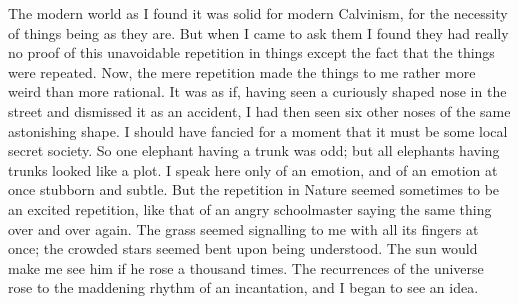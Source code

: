 \documentclass{book}
\begin{document}
The modern world as I found it was solid for modern Calvinism, for the necessity of things being as they are. But when I came to ask them I found they had really no proof of this unavoidable repetition in things except the fact that the things were repeated. Now, the mere repetition made the things to me rather more weird than more rational. It was as if, having seen a curiously shaped nose in the street and dismissed it as an accident, I had then seen six other noses of the same astonishing shape. I should have fancied for a moment that it must be some local secret society. So one elephant having a trunk was odd; but all elephants having trunks looked like a plot. I speak here only of an emotion, and of an emotion at once stubborn and subtle. But the repetition in Nature seemed sometimes to be an excited repetition, like that of an angry schoolmaster saying the same thing over and over again. The grass seemed signalling to me with all its fingers at once; the crowded stars seemed bent upon being understood. The sun would make me see him if he rose a thousand times. The recurrences of the universe rose to the maddening rhythm of an incantation, and I began to see an idea.
\end{document}
